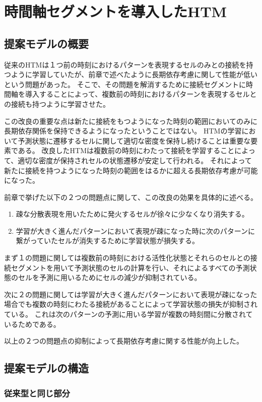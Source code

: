 \chapter{時間軸セグメントを導入したHTM}
\section{提案モデルの概要}
従来のHTMは１つ前の時刻におけるパターンを表現するセルのみとの接続を持つように学習していたが、前章で述べたように長期依存考慮に関して性能が低いという問題があった。
そこで、その問題を解消するために接続セグメントに時間軸を導入することによって、複数前の時刻におけるパターンを表現するセルとの接続も持つように学習させた。

この改良の重要な点は新たに接続をもつようになった時刻の範囲においてのみに長期依存関係を保持できるようになったということではない。
HTMの学習において予測状態に遷移するセルに関して適切な密度を保持し続けることは重要な要素である。
改良したHTMは複数前の時刻にわたって接続を学習することによって、適切な密度が保持されセルの状態遷移が安定して行われる。
それによって新たに接続を持つようになった時刻の範囲をはるかに超える長期依存考慮が可能になった。

前章で挙げた以下の２つの問題点に関して、この改良の効果を具体的に述べる。

\begin{enumerate}
  \item 疎な分散表現を用いたために発火するセルが徐々に少なくなり消失する。
  \item 学習が大きく進んだパターンにおいて表現が疎になった時に次のパターンに繋がっていたセルが消失するために学習状態が損失する。
\end{enumerate}

まず１の問題に関しては複数前の時刻における活性化状態とそれらのセルとの接続セグメントを用いて予測状態のセルの計算を行い、それによるすべての予測状態のセルを予測に用いるためにセルの減少が抑制されている。

次に２の問題に関しては学習が大きく進んだパターンにおいて表現が疎になった場合でも複数の時刻にわたる接続があることによって学習状態の損失が抑制されている。
これは次のパターンの予測に用いる学習が複数の時刻間に分散されているためである。

以上の２つの問題点の抑制によって長期依存考慮に関する性能が向上した。

\section{提案モデルの構造}
\subsection{従来型と同じ部分}

